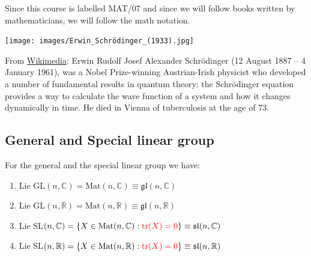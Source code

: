 \documentclass[../main.tex]{subfiles}
\begin{document}
Since this course is labelled MAT/07 and since we will follow books written by mathematicians, we will follow the math notation.
\begin{marginfigure}[-25mm]
	\texttt{[image: images/Erwin\_Schrödinger\_(1933).jpg]}
	\caption[Photo of Schrödinger]{From \href{https://commons.wikimedia.org/wiki/File:Erwin_Schr\%C3\%B6dinger_(1933).jpg}{Wikimedia}: Erwin Rudolf Josef Alexander Schrödinger (12 August 1887 – 4 January 1961), was a Nobel Prize-winning Austrian-Irish physicist who developed a number of fundamental results in quantum theory: the Schrödinger equation provides a way to calculate the wave function of a system and how it changes dynamically in time. He died in Vienna of tuberculosis at the age of 73.}
\end{marginfigure}
\subsection{General and Special linear group}
\begin{proposition}
For the general and the special linear group we have:
\renewcommand{\labelenumi}{\Roman{enumi})}
\begin{enumerate}
    \item Lie GL$(n,\mathbb{C})=\text{Mat}(n,\mathbb{C})\equiv\mathfrak{gl}(n,\mathbb{C})$
    \item Lie GL$(n,\mathbb{R})=\text{Mat}(n,\mathbb{R})\equiv\mathfrak{gl}(n,\mathbb{R})$
    \item Lie SL$(n,\mathbb{C})=\{X\in\text{Mat}(n,\mathbb{C}):{\color{red}\tr(X)=0}\}\equiv\mathfrak{sl}(n,\mathbb{C})$
    \item Lie SL$(n,\mathbb{R})=\{X\in\text{Mat}(n,\mathbb{R}):{\color{red}\tr(X)=0}\}\equiv\mathfrak{sl}(n,\mathbb{R})$
\end{enumerate}
\end{proposition}
\end{document}
